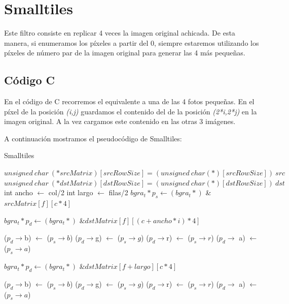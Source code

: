 \section{Smalltiles}
\par{Este filtro consiste en replicar 4 veces la imagen original achicada. De esta manera, si enumeramos los píxeles a partir del 0, siempre estaremos utilizando los píxeles de número par de la imagen original para generar las 4 más pequeñas.}
\subsection{Código C}
\par{En el código de C recorremos el equivalente a una de las 4 fotos pequeñas. En el píxel de la posición \emph{(i,j)} guardamos el contenido del de la posición \emph{(2*i,2*j)} en la imagen original. A la vez cargamos este contenido en las otras 3 imágenes.}
\par{A continuación mostramos el pseudocódigo de Smalltiles:}
\begin{algorithm}[h!]
\caption{Smalltiles}
\begin{algorithmic}
	\State $unsigned~ char~ (*srcMatrix)[srcRowSize] = (unsigned~ char (*)[srcRowSize])~ src$
	\State $unsigned~ char~ (*dstMatrix)[dstRowSize] = (unsigned~ char (*)[dstRowSize])~ dst$
	\State int ancho $\gets$ col/2
	\State int largo $\gets$ filas/2
			\State $bgra_t* p_s \gets (bgra_t*)$ \& $srcMatrix[f][c * 4]$
				
				\State $bgra_t *p_d \gets (bgra_t*)$ \&$dstMatrix[f][(c + ancho*i) * 4]$
				
				\State ($p_d \rightarrow$b) $\gets$ ($p_s \rightarrow b$)
				\State ($p_d \rightarrow$g) $\gets$ ($p_s \rightarrow g$)
				\State ($p_d \rightarrow$r) $\gets$ ($p_s \rightarrow r$)
				\State ($p_d \rightarrow$ a) $\gets$ ($p_s \rightarrow a$)
			\EndFor
				
				\State $bgra_t *p_d \gets (bgra_t*)$ \&$dstMatrix[f + largo][c * 4]$
				
				\State ($p_d \rightarrow$b) $\gets$ ($p_s \rightarrow b$)
				\State ($p_d \rightarrow$g) $\gets$ ($p_s \rightarrow g$)
				\State ($p_d \rightarrow$r) $\gets$ ($p_s \rightarrow r$)
				\State ($p_d \rightarrow$ a) $\gets$ ($p_s \rightarrow a$)
			\EndFor
		\EndFor
	\EndFor
\EndFunction

\end{algorithmic} 
\end{algorithm}
	
